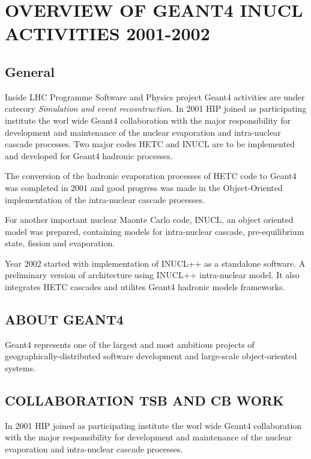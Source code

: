 \begin{appendix}
\scriptsize
\begin{verbatim}

\end{verbatim}
\normalsize

\section{OVERVIEW OF GEANT4 INUCL ACTIVITIES 2001-2002 }

\subsection{General}
Inside LHC Programme Software and Physics project Geant4 activities are under catecory {\it Simulation and event recosntruction}.
In 2001 HIP joined as participating institute the worl wide Geant4 collaboration with the major responsibility for development and maintenance of the nuclear evaporation and intra-nuclear cascade processes. 
Two major codes HETC and INUCL are to be implemented and developed for Geant4 hadronic processes.

The conversion of the hadronic evaporation processes of HETC code to Geant4 was completed in 2001 and good progress was made in the Object-Oriented implementation of the intra-nuclear cascade processes.

For another important nuclear Maonte Carlo code, INUCL, an object oriented model was prepared, containing models for intra-nuclear cascade, pre-equilibrium state, fission and evaporation. 

Year 2002 started with implementation of  INUCL++ as a standalone software.
A preliminary version of architecture using INUCL++ intra-nuclear model. It also integrates HETC cascades and utilites Geant4 hadronic models frameworks.

\subsection{ABOUT GEANT4}
Geant4 represents one of the largest and most ambitious projects of geographically-distributed software development and large-scale object-oriented systems.


\subsection{COLLABORATION TSB AND CB WORK}

In 2001 HIP joined as participating institute the worl wide Geant4 collaboration with the major responsibility for development and maintenance of the nuclear evaporation and intra-nuclear cascade processes. 


\end{appendix}
